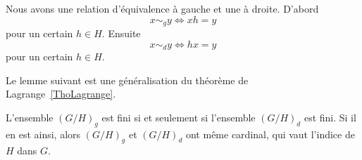 Nous avons une relation d'équivalence à gauche et une à droite. D'abord
\begin{equation}
	x\sim_g y\Leftrightarrow xh=y
\end{equation}
pour un certain \( h\in H\). Ensuite
\begin{equation}
	x\sim_d y\Leftrightarrow hx=y
\end{equation}
pour un certain \( h\in H\).

Le lemme suivant est une généralisation du théorème de Lagrange~\ref{ThoLagrange}.

\begin{lemma}		\label{LEMooUEFUooGQnEAY}
	L'ensemble \( (G/H)_g\) est fini si et seulement si l'ensemble \( (G/H)_d\) est fini. Si il en est ainsi, alors \( (G/H)_g\) et \( (G/H)_d\) ont même cardinal, qui vaut l'indice de \( H\) dans \( G\).
\end{lemma}

